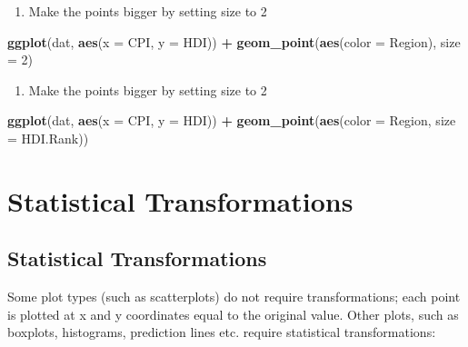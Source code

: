 \documentclass[]{book}
\newenvironment{Shaded}{\begin{snugshade}}{\end{snugshade}}
\newcommand{\KeywordTok}[1]{\textcolor[rgb]{0.13,0.29,0.53}{\textbf{#1}}}
\newcommand{\DataTypeTok}[1]{\textcolor[rgb]{0.13,0.29,0.53}{#1}}
\newcommand{\DecValTok}[1]{\textcolor[rgb]{0.00,0.00,0.81}{#1}}
\newcommand{\StringTok}[1]{\textcolor[rgb]{0.31,0.60,0.02}{#1}}
\newcommand{\OperatorTok}[1]{\textcolor[rgb]{0.81,0.36,0.00}{\textbf{#1}}}
\newcommand{\NormalTok}[1]{#1}
\providecommand{\tightlist}{%
  \setlength{\itemsep}{0pt}\setlength{\parskip}{0pt}}
\begin{document}
\begin{enumerate}
\def\labelenumi{\arabic{enumi}.}
\setcounter{enumi}{3}
\tightlist
\item
  Make the points bigger by setting size to 2
\end{enumerate}

\begin{Shaded}
\begin{Highlighting}[]
\KeywordTok{ggplot}\NormalTok{(dat, }\KeywordTok{aes}\NormalTok{(}\DataTypeTok{x =}\NormalTok{ CPI, }\DataTypeTok{y =}\NormalTok{ HDI)) }\OperatorTok{+}
\StringTok{  }\KeywordTok{geom_point}\NormalTok{(}\KeywordTok{aes}\NormalTok{(}\DataTypeTok{color =}\NormalTok{ Region), }\DataTypeTok{size =} \DecValTok{2}\NormalTok{)}
\end{Highlighting}
\end{Shaded}

\begin{enumerate}
\def\labelenumi{\arabic{enumi}.}
\setcounter{enumi}{4}
\tightlist
\item
  Make the points bigger by setting size to 2
\end{enumerate}

\begin{Shaded}
\begin{Highlighting}[]
\KeywordTok{ggplot}\NormalTok{(dat, }\KeywordTok{aes}\NormalTok{(}\DataTypeTok{x =}\NormalTok{ CPI, }\DataTypeTok{y =}\NormalTok{ HDI)) }\OperatorTok{+}
\KeywordTok{geom_point}\NormalTok{(}\KeywordTok{aes}\NormalTok{(}\DataTypeTok{color =}\NormalTok{ Region, }\DataTypeTok{size =}\NormalTok{  HDI.Rank))}
\end{Highlighting}
\end{Shaded}

\section{Statistical Transformations}\label{statistical-transformations}

\subsection{Statistical
Transformations}\label{statistical-transformations-1}

Some plot types (such as scatterplots) do not require transformations;
each point is plotted at x and y coordinates equal to the original
value. Other plots, such as boxplots, histograms, prediction lines etc.
require statistical transformations:
\end{document}
